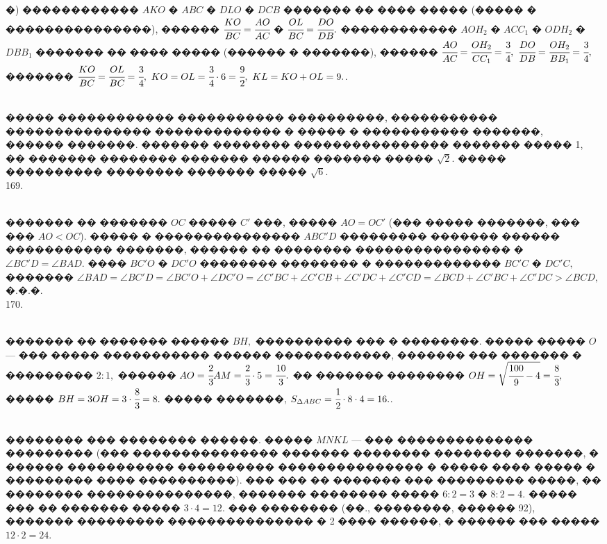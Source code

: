 \documentclass[12pt]{article}
\begin{document}
�) ������������ $AKO$ � $ABC$ � $DLO$ � $DCB$ ������� �� ���� ����� (����� � ���������������), ������ $\cfrac{KO}{BC}=\cfrac{AO}{AC}$ � $\cfrac{OL}{BC}=\cfrac{DO}{DB}.$ ������������ $AOH_2$ � $ACC_1$ � $ODH_2$ � $DBB_1$ ������� �� ���� ����� (������ � �������), ������ $\cfrac{AO}{AC}=\cfrac{OH_2}{CC_1}=\cfrac{3}{4},\ \cfrac{DO}{DB}=\cfrac{OH_2}{BB_1}=\cfrac{3}{4},$ ������� $\cfrac{KO}{BC}=\cfrac{OL}{BC}=\cfrac{3}{4},\
KO=OL=\cfrac{3}{4}\cdot6=\cfrac{9}{2},\ KL=KO+OL=9.$\newpage\noindent
168. \begin{figure}[ht!]
\end{figure}\\
����� ������������ ����������� ����������, ����������� ��������������� ������������� � ����� � ����������� �������, ������ �������. ������� �������� ���������������� ������� ����� 1, �� ������� �������� ������� ������ ������� ����� $\sqrt{2}.$ ����� ���������� �������� ������� ����� $\sqrt{6}.$\\
169. \begin{figure}[ht!]
\end{figure}\\
������� �� ������� $OC$ ����� $C'$ ���, ����� $AO=OC'$ (��� ����� �������, ��� ��� $AO<OC$). ����� � ��������������� $ABC'D$ ��������� ������� ������ ����������� �������, ������ �� �������� ���������������� � $\angle BC'D=\angle BAD.$ ���� $BC'O$ � $DC'O$ �������� �������� � ������������� $BC'C$ � $DC'C,$ ������� $\angle BAD=\angle BC'D=\angle BC'O+\angle DC'O=\angle C'BC+\angle C'CB+\angle C'DC+\angle C'CD=\angle BCD+\angle C'BC+\angle C'DC>\angle BCD,$ �.�.�.\\
170. \begin{figure}[ht!]
\end{figure}\\
������� �� ������� ������ $BH,$ ���������� ��� � ��������. ����� ����� $O$ --- ��� ����� ����������� ������ ������������, ������� ��� ������� � ��������� $2:1,$ ������ $AO=\cfrac{2}{3}AM=\cfrac{2}{3}\cdot5=\cfrac{10}{3}.$ �� ������� �������� $OH=\sqrt{\cfrac{100}{9}-4}=\cfrac{8}{3},$ ����� $BH=3OH=3\cdot\cfrac{8}{3}=8.$ ����� �������, $S_{\Delta ABC}=\cfrac{1}{2}\cdot8\cdot4=16.$\newpage\noindent
171. \begin{figure}[ht!]
\end{figure}\\
�������� ��� �������� ������. ����� $MNKL$ --- ��� �������������� ��������� (��� ��������������� ������� �������� �������� �������, � ������ ����������� ���������� ��������������� � ����� ���� ����� � ��������� ���� ����������). ��� ��� �� ������� ��� ��������� �����, �� �������� ���������������, ������� �������� ����� $6:2=3$ � $8:2=4.$ ����� ��� �� ������� ����� $3\cdot4=12.$ ��� �������� (��., ��������, ������ 92), ������� ��������� ��������������� � 2 ���� ������, � ������ ��� ����� $12\cdot2=24.$\\
\end{document}
